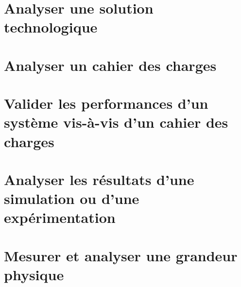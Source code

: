 \section{Analyser une solution technologique} 
\section{Analyser un cahier des charges} 
\section{Valider les performances d'un système vis-à-vis d'un cahier des charges} 
\section{Analyser les résultats d'une simulation ou d'une expérimentation} 
\section{Mesurer et analyser une grandeur physique} 
